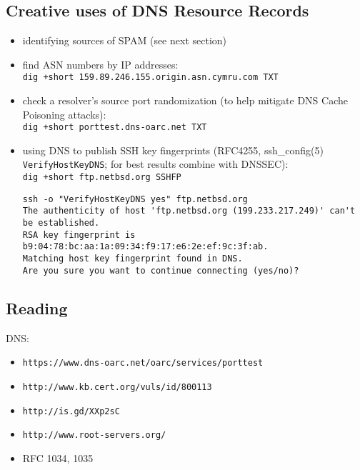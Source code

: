 \documentclass[xga]{xdvislides}
\begin{document}
\subsection{Creative uses of DNS Resource Records}
\begin{itemize}
	\item identifying sources of SPAM (see next section)
	\item find ASN numbers by IP addresses: \\
		\verb|dig +short 159.89.246.155.origin.asn.cymru.com TXT|
	\item check a resolver's source port randomization (to help
		mitigate DNS Cache Poisoning attacks): \\
		\verb|dig +short porttest.dns-oarc.net TXT|
	\item using DNS to publish SSH key fingerprints (RFC4255,
ssh\_config(5) \verb+VerifyHostKeyDNS+; for best results combine with DNSSEC): \\
		\verb|dig +short ftp.netbsd.org SSHFP| \\
		\begin{verbatim}
ssh -o "VerifyHostKeyDNS yes" ftp.netbsd.org
The authenticity of host 'ftp.netbsd.org (199.233.217.249)' can't be established.
RSA key fingerprint is b9:04:78:bc:aa:1a:09:34:f9:17:e6:2e:ef:9c:3f:ab.
Matching host key fingerprint found in DNS.
Are you sure you want to continue connecting (yes/no)?
\end{verbatim}
\end{itemize}


\subsection{Reading}
DNS:
\begin{itemize}
	\item \verb+https://www.dns-oarc.net/oarc/services/porttest+
	\item \verb+http://www.kb.cert.org/vuls/id/800113+
	\item \verb+http://is.gd/XXp2sC+
	\item \verb+http://www.root-servers.org/+
	\item RFC 1034, 1035
\end{itemize}
\addvspace{.5in}
\end{document}
